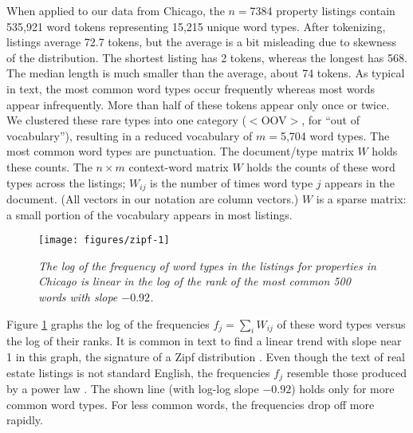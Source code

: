 \documentclass[12pt]{article}\usepackage[]{graphicx}\usepackage[]{color}
\newenvironment{knitrout}{}{} %
\begin{document}



 When applied to our data from Chicago, the $n=$7384 property
 listings contain 535,921 word tokens representing 15,215 unique word
 types.  After tokenizing, listings average
 72.7 tokens, but the average is a bit
 misleading due to skewness of the distribution.  The shortest listing
 has 2 tokens, whereas the longest has 568.  The median length is much
 smaller than the average, about 74
 tokens.  As typical in text, the most common word types occur
 frequently whereas most words appear infrequently.  More than half of
 these tokens appear only once or twice.  We clustered these rare
 types into one category ($<$OOV$>$, for ``out of vocabulary''),
 resulting in a reduced vocabulary of $m=$5,704 word types.  The most
 common word types are punctuation.  The document/type matrix $W$
 holds these counts.  The $n \times m$ context-word matrix $W$ holds
 the counts of these word types across the listings; $W_{ij}$ is the
 number of times word type $j$ appears in the \ith document.  (All
 vectors in our notation are column vectors.)  $W$ is a sparse matrix:
 a small portion of the vocabulary appears in most listings.


\begin{figure}
\begin{knitrout}
\color{fgcolor}

{\centering \texttt{[image: figures/zipf-1]} 

}



\end{knitrout}
\caption{    \label{fig:zipf}
 { \sl The log of the frequency of word types in the listings for
 properties in Chicago is linear in the log of the rank of the most
 common 500 words with slope \ensuremath{-0.92}.}  }
\end{figure}


 Figure \ref{fig:zipf} graphs the log of the frequencies $f_j = \sum_i
 W_{ij}$ of these word types versus the log of their ranks.  It is
 common in text to find a linear trend with slope near 1 in this
 graph, the signature of a Zipf distribution \citep{zipf35, baayen02}.
  Even though the text of real estate listings is not standard
 English, the frequencies $f_j$ resemble those produced by a power law
 \citep{clauset09}.  The shown line (with log-log slope
 \ensuremath{-0.92}) holds only for more common word types.  For
 less common words, the frequencies drop off more rapidly.
\end{document}
